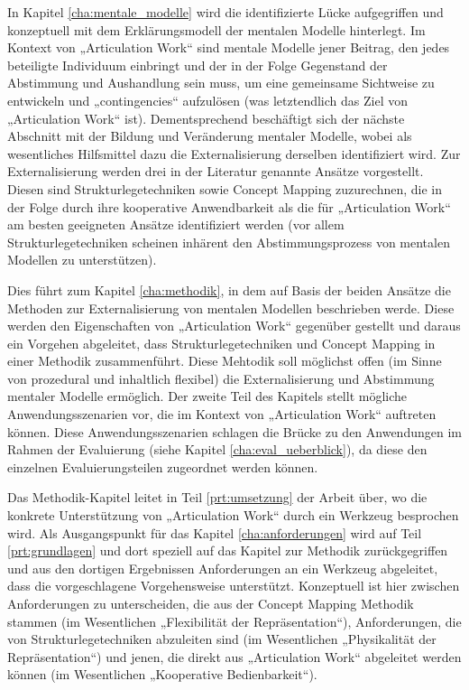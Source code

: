 In Kapitel \ref{cha:mentale_modelle} wird die identifizierte Lücke aufgegriffen und konzeptuell mit dem Erklärungsmodell der mentalen Modelle hinterlegt. Im Kontext von „Articulation Work“ sind mentale Modelle jener Beitrag, den jedes beteiligte Individuum einbringt und der in der Folge Gegenstand der Abstimmung und Aushandlung sein muss, um eine gemeinsame Sichtweise zu entwickeln und „contingencies“ aufzulösen (was letztendlich das Ziel von „Articulation Work“ ist). Dementsprechend beschäftigt sich der nächste Abschnitt mit der Bildung und Veränderung mentaler Modelle, wobei als wesentliches Hilfsmittel dazu die Externalisierung derselben identifiziert wird. Zur Externalisierung werden drei in der Literatur genannte Ansätze vorgestellt. Diesen sind Strukturlegetechniken sowie Concept Mapping zuzurechnen, die in der Folge durch ihre kooperative Anwendbarkeit als die für „Articulation Work“ am besten geeigneten Ansätze identifiziert werden (vor allem Strukturlegetechniken scheinen inhärent den Abstimmungsprozess von mentalen Modellen zu unterstützen).

Dies führt zum Kapitel \ref{cha:methodik}, in dem auf Basis der beiden Ansätze die Methoden zur Externalisierung von mentalen Modellen beschrieben werde. Diese werden den Eigenschaften von „Articulation Work“ gegenüber gestellt und daraus ein Vorgehen abgeleitet, dass Strukturlegetechniken und Concept Mapping in einer Methodik zusammenführt. Diese Mehtodik soll möglichst offen (im Sinne von prozedural und inhaltlich flexibel) die Externalisierung und Abstimmung mentaler Modelle ermöglich. Der zweite Teil des Kapitels stellt mögliche Anwendungsszenarien vor, die im Kontext von „Articulation Work“ auftreten können. Diese Anwendungsszenarien schlagen die Brücke zu den Anwendungen im Rahmen der Evaluierung (siehe Kapitel \ref{cha:eval_ueberblick}), da diese den einzelnen Evaluierungsteilen zugeordnet werden können.

Das Methodik-Kapitel leitet in Teil \ref{prt:umsetzung} der Arbeit über, wo die konkrete Unterstützung von „Articulation Work“ durch ein Werkzeug besprochen wird. Als Ausgangspunkt für das Kapitel \ref{cha:anforderungen} wird auf Teil \ref{prt:grundlagen} und dort speziell auf das Kapitel zur Methodik zurückgegriffen und aus den dortigen Ergebnissen Anforderungen an ein Werkzeug abgeleitet, dass die vorgeschlagene Vorgehensweise unterstützt. Konzeptuell ist hier zwischen Anforderungen zu unterscheiden, die aus der Concept Mapping Methodik stammen (im Wesentlichen „Flexibilität der Repräsentation“), Anforderungen, die von Strukturlegetechniken abzuleiten sind (im Wesentlichen „Physikalität der Repräsentation“) und jenen, die direkt aus „Articulation Work“ abgeleitet werden können (im Wesentlichen „Kooperative Bedienbarkeit“).

